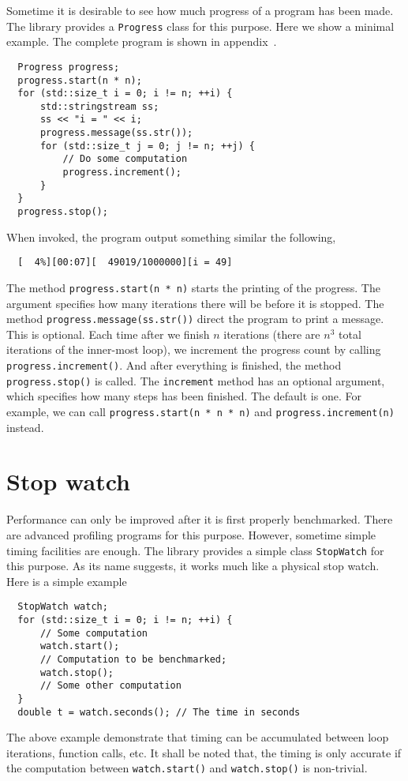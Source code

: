 Sometime it is desirable to see how much progress of a program has been made.
The library provides a \verb|Progress| class for this purpose. Here we show a
minimal example. The complete program is shown in
appendix~.
\begin{Verbatim}
  Progress progress;
  progress.start(n * n);
  for (std::size_t i = 0; i != n; ++i) {
      std::stringstream ss;
      ss << "i = " << i;
      progress.message(ss.str());
      for (std::size_t j = 0; j != n; ++j) {
          // Do some computation
          progress.increment();
      }
  }
  progress.stop();
\end{Verbatim}
When invoked, the program output something similar the following,
\begin{Verbatim}
  [  4%][00:07][  49019/1000000][i = 49]
\end{Verbatim}
The method \verb|progress.start(n * n)| starts the printing of the progress.
The argument specifies how many iterations there will be before it is stopped.
The method \verb|progress.message(ss.str())| direct the program to print a
message. This is optional. Each time after we finish $n$ iterations (there are
$n^3$ total iterations of the inner-most loop), we increment the progress count
by calling \verb|progress.increment()|. And after everything is finished, the
method \verb|progress.stop()| is called. The \verb|increment| method has an
optional argument, which specifies how many steps has been finished. The
default is one. For example, we can call \verb|progress.start(n * n * n)| and
\verb|progress.increment(n)| instead.

\section{Stop watch}
\label{sec:Stop watch}

Performance can only be improved after it is first properly benchmarked. There
are advanced profiling programs for this purpose. However, sometime simple
timing facilities are enough. The library provides a simple class
\verb|StopWatch| for this purpose. As its name suggests, it works much like a
physical stop watch. Here is a simple example
\begin{Verbatim}
  StopWatch watch;
  for (std::size_t i = 0; i != n; ++i) {
      // Some computation
      watch.start();
      // Computation to be benchmarked;
      watch.stop();
      // Some other computation
  }
  double t = watch.seconds(); // The time in seconds
\end{Verbatim}
The above example demonstrate that timing can be accumulated between loop
iterations, function calls, etc. It shall be noted that, the timing is only
accurate if the computation between \verb|watch.start()| and
\verb|watch.stop()| is non-trivial.
